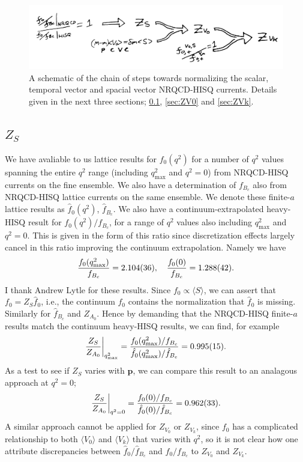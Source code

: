 \begin{figure}[htb!]
\hspace{-5pt}
    \includegraphics[width=1.0\textwidth]{images/nrqcd/normalization_chain.jpg}
  \caption{A schematic of the chain of steps towards normalizing the scalar, temporal vector and spacial vector NRQCD-HISQ currents. Details given in the next three sections; \ref{sec:Zs}, \ref{sec:ZV0} and \ref{sec:ZVk}. \label{fig:normalization_chain}}
\end{figure}

\subsection{$Z_S$}
\label{sec:Zs}

We have avaliable to us lattice results for $f_0(q^2)$ for a number of $q^2$ values spanning the entire $q^2$ range (including $q^2_{\text{max}}$ and $q^2=0$) from NRQCD-HISQ currents on the fine ensemble. We also have a determination of $f_{B_c}$ also from NRQCD-HISQ lattice currents on the same ensemble. We denote these finite-$a$ lattice results as $\hat{f}_0(q^2)$, $\hat{f}_{B_c}$. We also have a continuum-extrapolated heavy-HISQ result for $f_0(q^2)/f_{B_c}$, for a range of $q^2$ values also including $q^2_{\text{max}}$ and $q^2=0$. This is given in the form of this ratio since discretization effects largely cancel in this ratio improving the continuum extrapolation. Namely we have
\begin{align}
  {f_0(q^2_{\text{max}})\over f_{B_c}} = 2.104(36),\quad {f_0(0)\over f_{B_c}} = 1.288(42).
\end{align}
I thank Andrew Lytle for these results. Since $f_0\propto \langle S \rangle$, we can assert that $f_0 = Z_S \hat{f}_0$, i.e., the continuum $f_0$ contains the normalization that $\hat{f}_0$ is missing. Similarly for $\hat{f}_{B_c}$ and $Z_{A_0}$. Hence by demanding that the NRQCD-HISQ finite-$a$ results match the continuum heavy-HISQ results, we can find, for example
\begin{align}
  {Z_S \over Z_{A_0}}\bigg\vert_{q^2_{\text{max}}} = {f_0(q^2_{\text{max}})/f_{B_c}\over \hat{f}_0(q^2_{\text{max}})/\hat{f}_{B_c}} = 0.995(15).
\end{align}
As a test to see if $Z_S$ varies with ${\textbf{p}}$, we can compare this result to an analagous approach at $q^2=0$;
\begin{align}
  {Z_S \over Z_{A_0}}\bigg\vert_{q^2=0} = {f_0(0)/f_{B_c}\over \hat{f}_0(0)/\hat{f}_{B_c}} = 0.962(33).
\end{align}
A similar approach cannot be applied for $Z_{V_0}$ or $Z_{V_k}$, since $f_0$ has a complicated relationship to both $\langle V_0 \rangle$ and $\langle V_k \rangle$ that varies with $q^2$, so it is not clear how one attribute discrepancies between $\hat{f}_0/\hat{f}_{B_c}$ and $f_0/f_{B_c}$ to $Z_{V_0}$ and $Z_{V_k}$.

